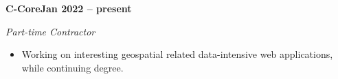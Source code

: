 \vspace{0.1cm}
\textbf{C-Core\hfill Jan 2022 -- present} \par
\textit{Part-time Contractor} \par
\begin{itemize}
	\item Working on interesting geospatial related data-intensive web applications, while continuing degree.
\end{itemize} \par